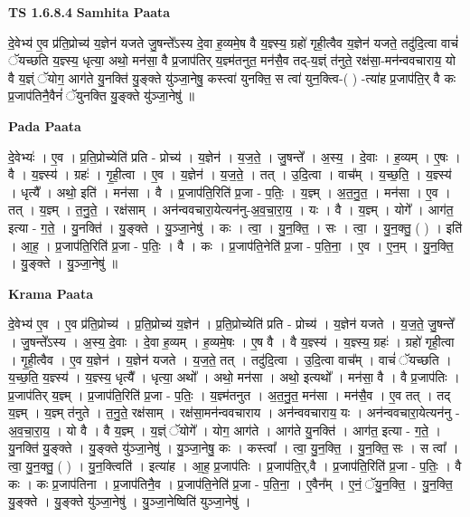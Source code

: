 \documentclass[17pt]{extarticle}
\begin{document}
\textbf{TS 1.6.8.4 } \newline
\textbf{Samhita Paata} \newline

दे॒वेभ्य॑ ए॒व प्र॑ति॒प्रोच्य॑ य॒ज्ञेन॑ यजते जु॒षन्ते᳚ऽस्य दे॒वा ह॒व्यमे॒ष वै य॒ज्ञ्स्य॒ ग्रहो॑ गृही॒त्वैव य॒ज्ञेन॑ यजते॒ तदु॑दि॒त्वा वाचं॑ ॅयच्छति य॒ज्ञ्स्य॒ धृत्या॒ अथो॒ मन॑सा॒ वै प्र॒जाप॑तिर् य॒ज्ञ्म॑तनुत॒ मन॑सै॒व तद्-य॒ज्ञ्ं त॑नुते॒ रक्ष॑सा॒-मन॑न्ववचाराय॒ यो वै य॒ज्ञ्ं ॅयोग॒ आग॑ते यु॒नक्ति॑ यु॒ङ्क्ते यु॑ञ्जा॒नेषु॒ कस्त्वा॑ युनक्ति॒ स त्वा॑ युन॒क्त्वि-( ) -त्या॑ह प्र॒जाप॑ति॒र् वै कः प्र॒जाप॑तिनै॒वैनं॑ ॅयुनक्ति यु॒ङ्क्ते यु॑ञ्जा॒नेषु॑ ॥ \newline

\textbf{Pada Paata} \newline

दे॒वेभ्यः॑ । ए॒व । प्र॒ति॒प्रोच्येति॑ प्रति - प्रोच्य॑ । य॒ज्ञेन॑ । य॒ज॒ते॒ । जु॒षन्ते᳚ । अ॒स्य॒ । दे॒वाः । ह॒व्यम् । ए॒षः । वै । य॒ज्ञ्स्य॑ । ग्रहः॑ । गृ॒ही॒त्वा । ए॒व । य॒ज्ञेन॑ । य॒ज॒ते॒ । तत् । उ॒दि॒त्वा । वाच᳚म् । य॒च्छ॒ति॒ । य॒ज्ञ्स्य॑ । धृत्यै᳚ । अथो॒ इति॑ । मन॑सा । वै । प्र॒जाप॑ति॒रिति॑ प्र॒जा - प॒तिः॒ । य॒ज्ञ्म् । अ॒त॒नु॒त॒ । मन॑सा । ए॒व । तत् । य॒ज्ञ्म् । त॒नु॒ते॒ । रक्ष॑साम् । अन॑न्ववचारा॒येत्यन॑नु-अ॒व॒चा॒रा॒य॒ । यः । वै । य॒ज्ञ्म् । योगे᳚ । आग॑त॒ इत्या - ग॒ते॒ । यु॒नक्ति॑ । यु॒ङ्क्ते । यु॒ञ्जा॒नेषु॑ । कः । त्वा॒ । यु॒न॒क्ति॒ । सः । त्वा॒ । यु॒न॒क्तु॒ ( ) । इति॑ । आ॒ह॒ । प्र॒जाप॑ति॒रिति॑ प्र॒जा - प॒तिः॒ । वै । कः । प्र॒जाप॑ति॒नेति॑ प्र॒जा - प॒ति॒ना॒ । ए॒व । ए॒न॒म् । यु॒न॒क्ति॒ । यु॒ङ्क्ते । यु॒ञ्जा॒नेषु॑ ॥  \newline


\textbf{Krama Paata} \newline

दे॒वेभ्य॑ ए॒व । ए॒व प्र॑ति॒प्रोच्य॑ । प्र॒ति॒प्रोच्य॑ य॒ज्ञेन॑ । प्र॒ति॒प्रोच्येति॑ प्रति - प्रोच्य॑ । य॒ज्ञेन॑ यजते । य॒ज॒ते॒ जु॒षन्ते᳚ । जु॒षन्ते᳚ऽस्य । अ॒स्य॒ दे॒वाः । दे॒वा ह॒व्यम् । ह॒व्यमे॒षः । ए॒ष वै । वै य॒ज्ञ्स्य॑ । य॒ज्ञ्स्य॒ ग्रहः॑ । ग्रहो॑ गृही॒त्वा । गृ॒ही॒त्वैव । ए॒व य॒ज्ञेन॑ । य॒ज्ञेन॑ यजते । य॒ज॒ते॒ तत् । तदु॑दि॒त्वा । उ॒दि॒त्वा वाच᳚म् । वाचं॑ ॅयच्छति । य॒च्छ॒ति॒ य॒ज्ञ्स्य॑ । य॒ज्ञ्स्य॒ धृत्यै᳚ । धृत्या॒ अथो᳚ । अथो॒ मन॑सा । अथो॒ इत्यथो᳚ । मन॑सा॒ वै । वै प्र॒जाप॑तिः । प्र॒जाप॑तिर् य॒ज्ञ्म् । प्र॒जाप॑ति॒रिति॑ प्र॒जा - प॒तिः॒ । य॒ज्ञ्म॑तनुत । अ॒त॒नु॒त॒ मन॑सा । मन॑सै॒व । ए॒व तत् । तद् य॒ज्ञ्म् । य॒ज्ञ्म् त॑नुते । त॒नु॒ते॒ रक्ष॑साम् । रक्ष॑सा॒मन॑न्ववचाराय । अन॑न्ववचाराय॒ यः । अन॑न्ववचारा॒येत्यन॑नु - अ॒व॒चा॒रा॒य॒ । यो वै । वै य॒ज्ञ्म् । य॒ज्ञ्ं ॅयोगे᳚ । योग॒ आग॑ते । आग॑ते यु॒नक्ति॑ । आग॑त॒ इत्या - ग॒ते॒ । यु॒नक्ति॑ यु॒ङ्क्ते । यु॒ङ्क्ते यु॑ञ्जा॒नेषु॑ । यु॒ञ्जा॒नेषु॒ कः । कस्त्वा᳚ । त्वा॒ यु॒न॒क्ति॒ । यु॒न॒क्ति॒ सः । स त्वा᳚ । त्वा॒ यु॒न॒क्तु॒ ( ) । यु॒न॒क्त्विति॑ । इत्या॑ह । आ॒ह॒ प्र॒जाप॑तिः । प्र॒जाप॑ति॒र्,वै । प्र॒जाप॑ति॒रिति॑ प्र॒जा - प॒तिः॒ । वै कः । कः प्र॒जाप॑तिना । प्र॒जाप॑तिनै॒व । प्र॒जाप॑ति॒नेति॑ प्र॒जा - प॒ति॒ना॒ । ए॒वैन᳚म् । ए॒नं॒ ॅयु॒न॒क्ति॒ । यु॒न॒क्ति॒ यु॒ङ्क्ते । यु॒ङ्क्ते यु॑ञ्जा॒नेषु॑ । यु॒ञ्जा॒नेष्विति॑ युञ्जा॒नेषु॑ । \newline
\end{document}
